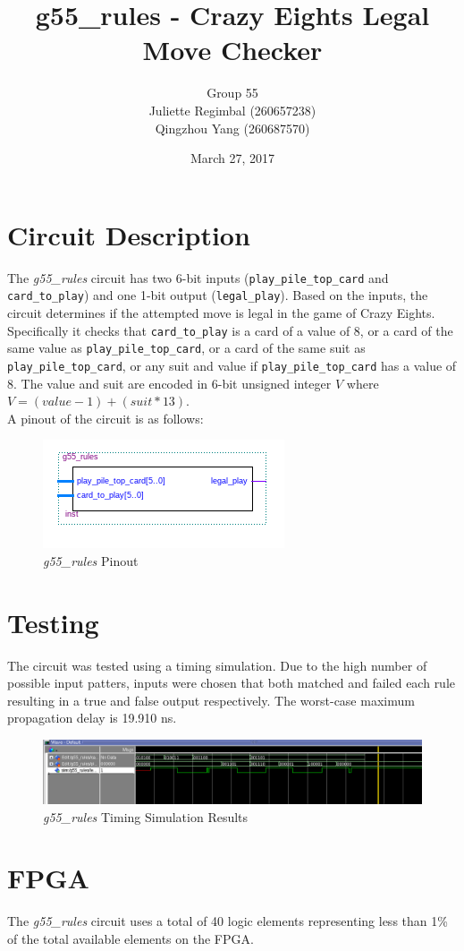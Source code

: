 \documentclass[12pt]{article}
\title{g55\_rules - Crazy Eights Legal Move Checker}
\author{Group 55\\Juliette Regimbal (260657238)\\Qingzhou Yang (260687570)}
\date{March 27, 2017}
\begin{document}
\maketitle
\setlength{\parindent}{0ex}
\section{Circuit Description}
The \textit{g55\_rules} circuit has two 6-bit inputs (\texttt{play\_pile\_top\_card} and \texttt{card\_to\_play}) and one 1-bit output (\texttt{legal\_play}). Based on the inputs, the circuit determines if the attempted move is legal in the game of Crazy Eights. Specifically it checks that \texttt{card\_to\_play} is a card of a value of 8, or a card of the same value as \texttt{play\_pile\_top\_card}, or a card of the same suit as \texttt{play\_pile\_top\_card}, or any suit and value if \texttt{play\_pile\_top\_card} has a value of 8. The value and suit are encoded in 6-bit unsigned integer $V$ where $V = (value - 1) + (suit * 13)$.\\

A pinout of the circuit is as follows:\\

\begin{figure}[h!t]
\centering
\includegraphics[scale=1.0]{graphics/rules-pinout.png}
\caption{\textit{g55\_rules} Pinout}
\end{figure}

\section{Testing}
The circuit was tested using a timing simulation. Due to the high number of possible input patters, inputs were chosen that both matched and failed each rule resulting in a true and false output respectively. The worst-case maximum propagation delay is 19.910 ns. \\

\begin{figure}[h!t]
\centering
\includegraphics[scale=0.5]{graphics/rules-sim.png}
\caption{\textit{g55\_rules} Timing Simulation Results}
\end{figure}

\section{FPGA}
The \textit{g55\_rules} circuit uses a total of 40 logic elements representing less than 1\% of the total available elements on the FPGA.
\end{document}
